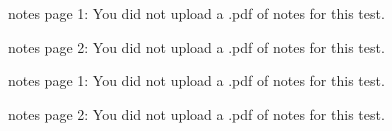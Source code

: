 \documentclass{article}
\begin{document}
\thispagestyle{empty}

\vspace*{-1.5in}
  \begin{center}
    notes page 1: You did not upload a .pdf of notes for this test.
  \end{center}
  
\newpage

\thispagestyle{empty}

\vspace*{-1.5in}
  \begin{center}
    notes page 2: You did not upload a .pdf of notes for this test.
  \end{center}

\newpage
  \thispagestyle{empty}

\vspace*{-1.5in}
  \begin{center}
    notes page 1: You did not upload a .pdf of notes for this test.
  \end{center}

\newpage
  \thispagestyle{empty}

\vspace*{-1.5in}
  \begin{center}
    notes page 2: You did not upload a .pdf of notes for this test.
  \end{center}

  
\end{document}
